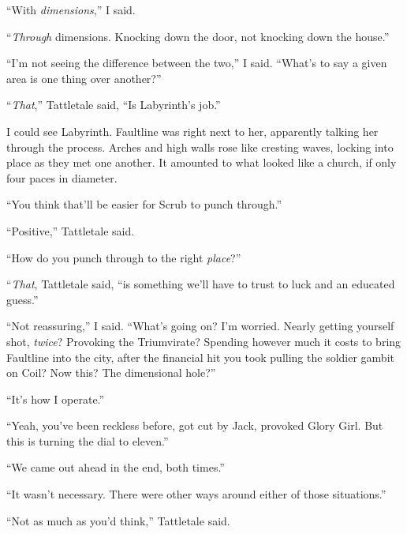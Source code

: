 ``With \emph{dimensions},'' I said.



``\emph{Through} dimensions.  Knocking down the door, not knocking down the house.''



``I'm not seeing the difference between the two,'' I said.  ``What's to say a given area is one thing over another?''



``\emph{That},'' Tattletale said, ``Is Labyrinth's job.''



I could see Labyrinth.  Faultline was right next to her, apparently talking her through the process.  Arches and high walls rose like cresting waves, locking into place as they met one another.  It amounted to what looked like a church, if only four paces in diameter.



``You think that'll be easier for Scrub to punch through.''



``Positive,'' Tattletale said.



``How do you punch through to the right \emph{place}?''



``\emph{That}, Tattletale said, ``is something we'll have to trust to luck and an educated guess.''



``Not reassuring,'' I said.  ``What's going on?  I'm worried.  Nearly getting yourself shot, \emph{twice}?  Provoking the Triumvirate?  Spending however much it costs to bring Faultline into the city, after the financial hit you took pulling the soldier gambit on Coil?  Now this?  The dimensional hole?''



``It's how I operate.''



``Yeah, you've been reckless before, got cut by Jack, provoked Glory Girl.  But this is turning the dial to eleven.''



``We came out ahead in the end, both times.''



``It wasn't necessary.  There were other ways around either of those situations.''



``Not as much as you'd think,'' Tattletale said.



